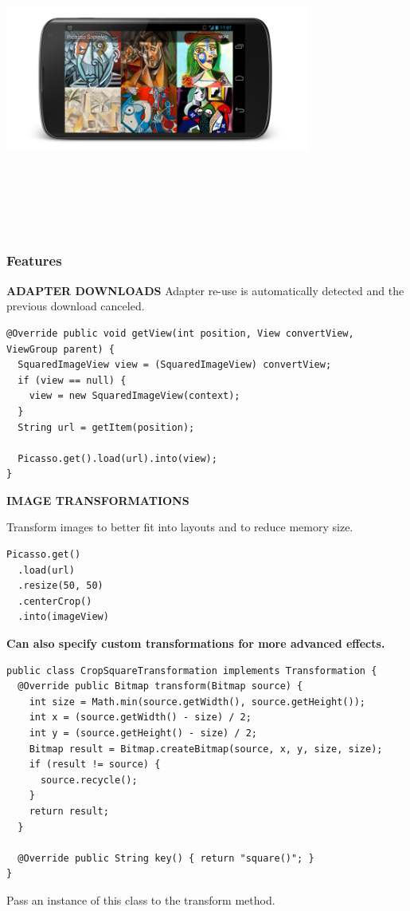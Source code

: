 \begin{center}
    \includegraphics[width=10cm,height=10cm,keepaspectratio]{Images/picassoex1.png}
\end{center}
\newpage

\subsubsection{Features}

\textbf{ADAPTER DOWNLOADS}\newline
Adapter re-use is automatically detected and the previous download canceled.
\begin{verbatim}
@Override public void getView(int position, View convertView, ViewGroup parent) {
  SquaredImageView view = (SquaredImageView) convertView;
  if (view == null) {
    view = new SquaredImageView(context);
  }
  String url = getItem(position);

  Picasso.get().load(url).into(view);
}
\end{verbatim}


\textbf{IMAGE TRANSFORMATIONS}\newline

Transform images to better fit into layouts and to reduce memory size.
\begin{verbatim}
Picasso.get()
  .load(url)
  .resize(50, 50)
  .centerCrop()
  .into(imageView)
\end{verbatim}
\textbf{Can also specify custom transformations for more advanced effects.}
\begin{verbatim}
public class CropSquareTransformation implements Transformation {
  @Override public Bitmap transform(Bitmap source) {
    int size = Math.min(source.getWidth(), source.getHeight());
    int x = (source.getWidth() - size) / 2;
    int y = (source.getHeight() - size) / 2;
    Bitmap result = Bitmap.createBitmap(source, x, y, size, size);
    if (result != source) {
      source.recycle();
    }
    return result;
  }

  @Override public String key() { return "square()"; }
}
\end{verbatim}
Pass an instance of this class to the transform method.
\newpage

